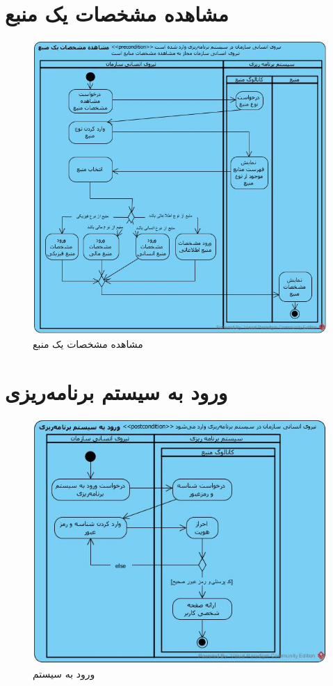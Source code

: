\section{مشاهده مشخصات یک منبع}
\begin{figure}[H]
	\centering
	\includegraphics[scale=0.7]{img/activity/ViewResourceAttributes}
	\caption{مشاهده مشخصات یک منبع}
\end{figure}

\section{ورود به سیستم برنامه‌ریزی}
\begin{figure}[H]
	\centering
	\includegraphics[scale=0.8]{img/activity/SignIn}
	\caption{ورود به سیستم}
\end{figure}


